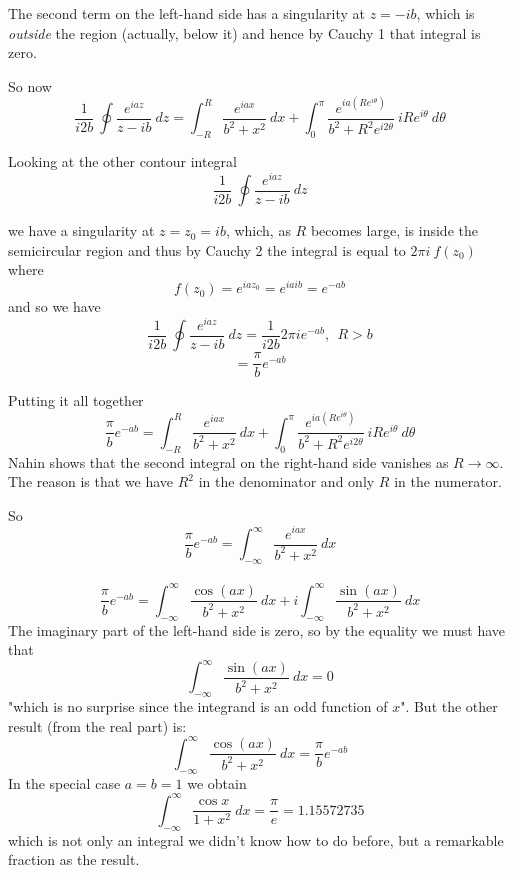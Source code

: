 \documentclass[11pt, oneside]{article}
\begin{document}
The second term on the left-hand side has a singularity at $z = -ib$, which is \emph{outside} the region (actually, below it) and hence by Cauchy 1 that integral is zero.

So now
\[ \frac{1}{i2b} \ \oint \frac{e^{iaz}}{z-ib} \ dz  = \int_{-R}^R \frac{e^{iax}}{b^2 + x^2} \ dx + \int_0^{\pi}  \frac{e^{ia(Re^{i\theta})}}{b^2 + R^2e^{i2\theta}}  \ iRe^{i\theta} \ d \theta \]

Looking at the other contour integral 
\[ \frac{1}{i2b} \ \oint \frac{e^{iaz}}{z-ib} \ dz  \]

we have a singularity at $z = z_0 = ib$, which, as $R$ becomes large, is inside the semicircular region and thus by Cauchy 2 the integral is equal to $2 \pi i \ f(z_0)$ where
\[ f(z_0) = e^{iaz_0} = e^{iaib} = e^{-ab} \]
and so we have
\[ \frac{1}{i2b} \ \oint \frac{e^{iaz}}{z-ib} \ dz = \frac{1}{i2b} 2 \pi i e^{-ab}, \ \ R > b \]
\[ = \frac{\pi}{b} e^{-ab} \]

Putting it all together
\[ \frac{\pi}{b} e^{-ab} = \int_{-R}^R \frac{e^{iax}}{b^2 + x^2} \ dx + \int_0^{\pi}  \frac{e^{ia(Re^{i\theta})}}{b^2 + R^2e^{i2\theta}}  \ iRe^{i\theta} \ d \theta \]
Nahin shows that the second integral on the right-hand side vanishes as $R \rightarrow \infty$.  The reason is that we have $R^2$ in the denominator and only $R$ in the numerator.

So
\[ \frac{\pi}{b} e^{-ab} = \int_{-\infty}^{\infty} \frac{e^{iax}}{b^2 + x^2} \ dx \]\
\[ \frac{\pi}{b} e^{-ab} = \int_{-\infty}^{\infty} \frac{\cos(ax)}{b^2 + x^2} \ dx + i  \int_{-\infty}^{\infty} \frac{\sin(ax)}{b^2 + x^2} \ dx \]
The imaginary part of the left-hand side is zero, so by the equality we must have that
\[ \int_{-\infty}^{\infty} \frac{\sin(ax)}{b^2 + x^2} \ dx = 0 \]
"which is no surprise since the integrand is an odd function of $x$".  But the other result (from the real part) is:
\[ \int_{-\infty}^{\infty} \frac{\cos(ax)}{b^2 + x^2} \ dx = \frac{\pi}{b} e^{-ab} \]
In the special case $a = b = 1$ we obtain
\[ \int_{-\infty}^{\infty} \frac{\cos x }{1 + x^2} \ dx = \frac{\pi}{e} = 1.15572735 \]
which is not only an integral we didn't know how to do before, but a remarkable fraction as the result.
\end{document}
